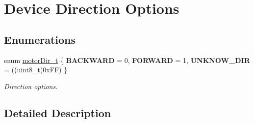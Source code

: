\hypertarget{group___device___direction___options}{}\section{Device Direction Options}
\label{group___device___direction___options}
\subsection*{Enumerations}
\begin{DoxyCompactItemize}
\item 
\mbox{\label{group___device___direction___options_ga4eaf4196e4d11d552f58f3fab218a8c7}} 
enum \mbox{\hyperlink{group___device___direction___options_ga4eaf4196e4d11d552f58f3fab218a8c7}{motor\+Dir\+\_\+t}} \{ {\bfseries B\+A\+C\+K\+W\+A\+RD} = 0, 
{\bfseries F\+O\+R\+W\+A\+RD} = 1, 
{\bfseries U\+N\+K\+N\+O\+W\+\_\+\+D\+IR} = ((uint8\+\_\+t)0x\+FF)
 \}
\begin{DoxyCompactList}\small\item\em Direction options. \end{DoxyCompactList}\end{DoxyCompactItemize}


\subsection{Detailed Description}
